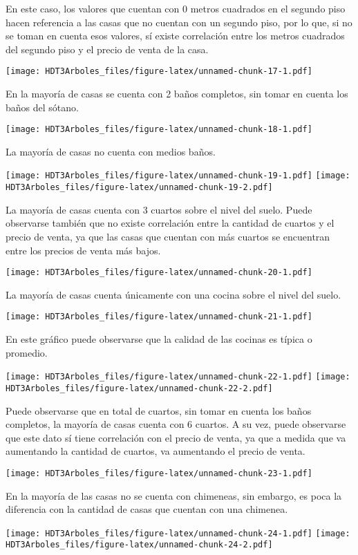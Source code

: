 \documentclass[
]{article}
\begin{document}
En este caso, los valores que cuentan con 0 metros cuadrados en el
segundo piso hacen referencia a las casas que no cuentan con un segundo
piso, por lo que, si no se toman en cuenta esos valores, sí existe
correlación entre los metros cuadrados del segundo piso y el precio de
venta de la casa.

\texttt{[image: HDT3Arboles\_files/figure-latex/unnamed-chunk-17-1.pdf]}

En la mayoría de casas se cuenta con 2 baños completos, sin tomar en
cuenta los baños del sótano.

\texttt{[image: HDT3Arboles\_files/figure-latex/unnamed-chunk-18-1.pdf]}

La mayoría de casas no cuenta con medios baños.

\texttt{[image: HDT3Arboles\_files/figure-latex/unnamed-chunk-19-1.pdf]}
\texttt{[image: HDT3Arboles\_files/figure-latex/unnamed-chunk-19-2.pdf]}

La mayoría de casas cuenta con 3 cuartos sobre el nivel del suelo. Puede
observarse también que no existe correlación entre la cantidad de
cuartos y el precio de venta, ya que las casas que cuentan con más
cuartos se encuentran entre los precios de venta más bajos.

\texttt{[image: HDT3Arboles\_files/figure-latex/unnamed-chunk-20-1.pdf]}

La mayoría de casas cuenta únicamente con una cocina sobre el nivel del
suelo.

\texttt{[image: HDT3Arboles\_files/figure-latex/unnamed-chunk-21-1.pdf]}

En este gráfico puede observarse que la calidad de las cocinas es típica
o promedio.

\texttt{[image: HDT3Arboles\_files/figure-latex/unnamed-chunk-22-1.pdf]}
\texttt{[image: HDT3Arboles\_files/figure-latex/unnamed-chunk-22-2.pdf]}

Puede observarse que en total de cuartos, sin tomar en cuenta los baños
completos, la mayoría de casas cuenta con 6 cuartos. A su vez, puede
observarse que este dato sí tiene correlación con el precio de venta, ya
que a medida que va aumentando la cantidad de cuartos, va aumentando el
precio de venta.

\texttt{[image: HDT3Arboles\_files/figure-latex/unnamed-chunk-23-1.pdf]}

En la mayoría de las casas no se cuenta con chimeneas, sin embargo, es
poca la diferencia con la cantidad de casas que cuentan con una
chimenea.

\texttt{[image: HDT3Arboles\_files/figure-latex/unnamed-chunk-24-1.pdf]}
\texttt{[image: HDT3Arboles\_files/figure-latex/unnamed-chunk-24-2.pdf]}
\end{document}
